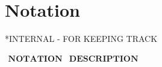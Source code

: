 \section{Notation}
*INTERNAL - FOR KEEPING TRACK

$
\begin{array}{ll}
	\textbf{NOTATION} & \textbf{DESCRIPTION}\\
	
\end{array}
$